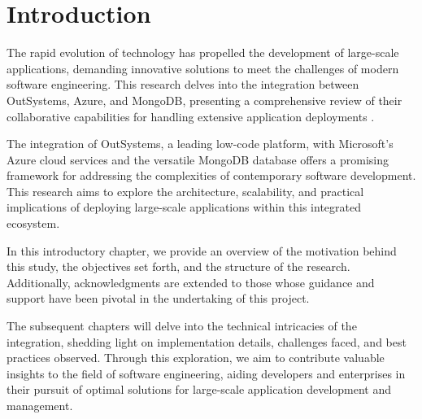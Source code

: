 \section{Introduction}\label{sec:introduction}
    
    The rapid evolution of technology has propelled the development of large-scale applications, demanding innovative solutions to meet the challenges of modern software engineering. This research delves into the integration between OutSystems, Azure, and MongoDB, presenting a comprehensive review of their collaborative capabilities for handling extensive application deployments \cite{iscac}.
    
    The integration of OutSystems, a leading low-code platform, with Microsoft's Azure cloud services and the versatile MongoDB database offers a promising framework for addressing the complexities of contemporary software development. This research aims to explore the architecture, scalability, and practical implications of deploying large-scale applications within this integrated ecosystem.
    
    In this introductory chapter, we provide an overview of the motivation behind this study, the objectives set forth, and the structure of the research. Additionally, acknowledgments are extended to those whose guidance and support have been pivotal in the undertaking of this project.
    
    The subsequent chapters will delve into the technical intricacies of the integration, shedding light on implementation details, challenges faced, and best practices observed. Through this exploration, we aim to contribute valuable insights to the field of software engineering, aiding developers and enterprises in their pursuit of optimal solutions for large-scale application development and management.
